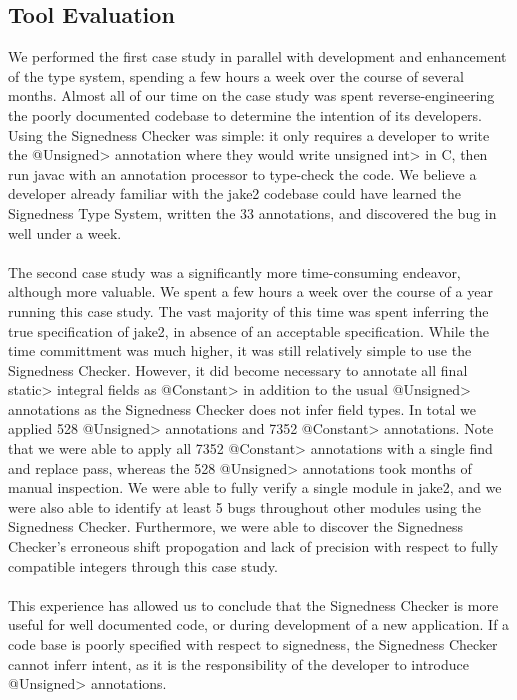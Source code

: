 \subsection{Tool Evaluation} \label{eval}
We performed the first case study in parallel with development and enhancement of
the type system, spending a few hours a week over the course of several months.
Almost all of our time on the case study
was spent reverse-engineering the poorly documented codebase to determine
the intention of its developers. Using
the Signedness Checker was simple:  it only requires a developer to
write the \<@Unsigned> annotation where they would write \<unsigned
int> in C,
then run javac with an annotation processor to type-check the code.
We believe a developer already familiar with the jake2 codebase could have
learned the Signedness Type System,
written the 33 annotations, and discovered the bug in well under a week.\\
\\
The second case study was a significantly more time-consuming endeavor, although
more valuable. We spent a few hours a week over the course of a year running
this case study. The vast majority of this time was spent inferring the true
specification of jake2, in absence of an acceptable specification.
While the time committment was much higher, it was still relatively simple to
use the Signedness Checker. However, it did become necessary to annotate all
\<final static> integral fields as \<@Constant> in addition to the usual
\<@Unsigned> annotations as the Signedness Checker does not infer field types.
In total we applied 528 \<@Unsigned> annotations and 7352 \<@Constant>
annotations. Note that we were able to apply all 7352 \<@Constant> annotations
with a single find and replace pass, whereas the 528 \<@Unsigned> annotations
took months of manual inspection.
We were able to fully verify a single module in jake2,
and we were also able to identify at least 5 bugs throughout other modules using
the Signedness Checker. Furthermore, we were able to discover the Signedness
Checker's erroneous shift propogation and lack of precision with respect to
fully compatible integers through this case study.\\
\\
This experience has allowed us to conclude that the Signedness Checker is
more useful for well documented code, or during development of a new
application. If a code base is poorly specified with respect to signedness,
the Signedness Checker cannot inferr intent, as it is the responsibility of the
developer to introduce \<@Unsigned> annotations.


